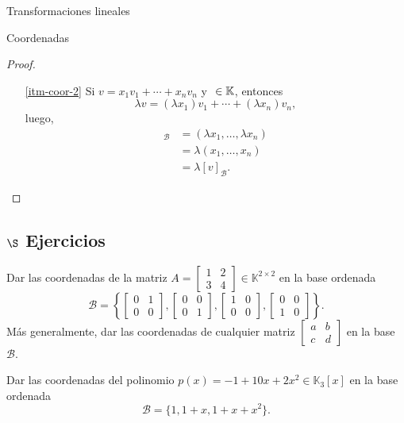 \begin{chapter}{Transformaciones lineales}
\begin{section}{Coordenadas}
\begin{proof}
\begin{enumerate}
            \item[\ref{itm-coor-2}] Si $v = x_1v_1 + \cdots +x_nv_n$ y $\ \in \mathbb K$, entonces 
            $$
            \lambda v = (\lambda x_1)v_1 + \cdots +(\lambda x_n)v_n,
            $$
            luego,
            \begin{align*}
                [\lambda v ]_\mathcal{B} &= (\lambda x_1,\ldots , \lambda x_n )\\
            &= \lambda (x_1,\ldots ,x_n) \\
            &= \lambda [v]_\mathcal{B}.
            \end{align*}
        \end{enumerate}
    \end{proof}
    
    \subsection*{$\S$ Ejercicios}
    \begin{enumex}
        \item Dar las coordenadas de la matriz
        $A=\begin{bmatrix}1&2\\3&4\end{bmatrix} \in \mathbb{K}^{2\times 2} $ en la base ordenada
        $$
        \mathcal{B}=\left\{
        \begin{bmatrix} 0&1\\0&0 \end{bmatrix},
        \begin{bmatrix} 0&0\\0&1 \end{bmatrix},
        \begin{bmatrix} 1&0\\0&0 \end{bmatrix},
        \begin{bmatrix} 0&0\\1&0 \end{bmatrix}
            \right\}.
        $$
        Más generalmente, dar las coordenadas de cualquier matriz $\begin{bmatrix} a&b\\c&d \end{bmatrix}$ en la base $\mathcal{B}$.

        \item Dar las coordenadas del polinomio $p(x) = -1+10x+2x^2\in\mathbb{K}_3[x]$ en la base ordenada $$\mathcal{B}=\{1,1+x,1+x+x^2\}.$$


\end{enumex}
\end{section}
\end{chapter}
